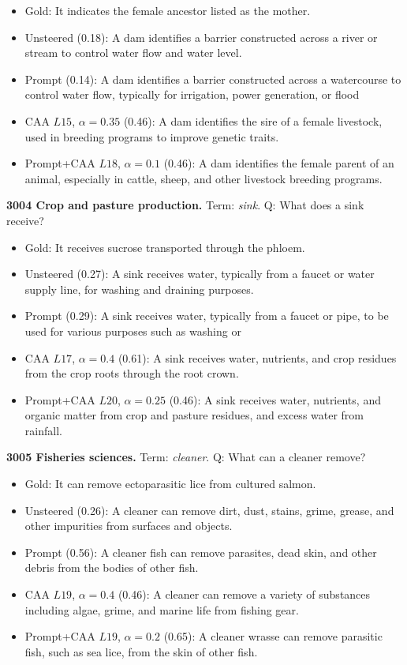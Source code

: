 \begin{itemize}\setlength{\itemsep}{0.15em}\setlength{\parsep}{0pt}\setlength{\topsep}{0.2em}
\item Gold: It indicates the female ancestor listed as the mother.
\item Unsteered (0.18): A dam identifies a barrier constructed across a river or stream to control water flow and water level.
\item Prompt (0.14): A dam identifies a barrier constructed across a watercourse to control water flow, typically for irrigation, power generation, or flood
\item CAA $L15$, $\alpha=0.35$ (0.46): A dam identifies the sire of a female livestock, used in breeding programs to improve genetic traits.
\item Prompt+CAA $L18$, $\alpha=0.1$ (0.46): A dam identifies the female parent of an animal, especially in cattle, sheep, and other livestock breeding programs.
\end{itemize}
\medskip\noindent\textbf{3004 Crop and pasture production.} Term: \emph{sink}.
Q: What does a sink receive?
\begin{itemize}\setlength{\itemsep}{0.15em}\setlength{\parsep}{0pt}\setlength{\topsep}{0.2em}
\item Gold: It receives sucrose transported through the phloem.
\item Unsteered (0.27): A sink receives water, typically from a faucet or water supply line, for washing and draining purposes.
\item Prompt (0.29): A sink receives water, typically from a faucet or pipe, to be used for various purposes such as washing or
\item CAA $L17$, $\alpha=0.4$ (0.61): A sink receives water, nutrients, and crop residues from the crop roots through the root crown.
\item Prompt+CAA $L20$, $\alpha=0.25$ (0.46): A sink receives water, nutrients, and organic matter from crop and pasture residues, and excess water from rainfall.
\end{itemize}
\medskip\noindent\textbf{3005 Fisheries sciences.} Term: \emph{cleaner}.
Q: What can a cleaner remove?
\begin{itemize}\setlength{\itemsep}{0.15em}\setlength{\parsep}{0pt}\setlength{\topsep}{0.2em}
\item Gold: It can remove ectoparasitic lice from cultured salmon.
\item Unsteered (0.26): A cleaner can remove dirt, dust, stains, grime, grease, and other impurities from surfaces and objects.
\item Prompt (0.56): A cleaner fish can remove parasites, dead skin, and other debris from the bodies of other fish.
\item CAA $L19$, $\alpha=0.4$ (0.46): A cleaner can remove a variety of substances including algae, grime, and marine life from fishing gear.
\item Prompt+CAA $L19$, $\alpha=0.2$ (0.65): A cleaner wrasse can remove parasitic fish, such as sea lice, from the skin of other fish.
\end{itemize}
